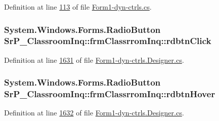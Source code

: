 \-Definition at line \hyperlink{_form1-dyn-ctrls_8cs_source_l00113}{113} of file \hyperlink{_form1-dyn-ctrls_8cs_source}{\-Form1-\/dyn-\/ctrls.\-cs}.

\hypertarget{class_sr_p___classroom_inq_1_1frm_classrrom_inq_a116a0f948fdc7187ae7dc028026eec59}{
\subsubsection[{rdbtn\-Click}]{\setlength{\rightskip}{0pt plus 5cm}\-System.\-Windows.\-Forms.\-Radio\-Button {\bf \-Sr\-P\-\_\-\-Classroom\-Inq\-::frm\-Classrrom\-Inq\-::rdbtn\-Click}}}
\label{class_sr_p___classroom_inq_1_1frm_classrrom_inq_a116a0f948fdc7187ae7dc028026eec59}


\-Definition at line \hyperlink{_form1-dyn-ctrls_8_designer_8cs_source_l01631}{1631} of file \hyperlink{_form1-dyn-ctrls_8_designer_8cs_source}{\-Form1-\/dyn-\/ctrls.\-Designer.\-cs}.

\hypertarget{class_sr_p___classroom_inq_1_1frm_classrrom_inq_a2bee4d450744662c189d99c17658dac7}{
\subsubsection[{rdbtn\-Hover}]{\setlength{\rightskip}{0pt plus 5cm}\-System.\-Windows.\-Forms.\-Radio\-Button {\bf \-Sr\-P\-\_\-\-Classroom\-Inq\-::frm\-Classrrom\-Inq\-::rdbtn\-Hover}}}
\label{class_sr_p___classroom_inq_1_1frm_classrrom_inq_a2bee4d450744662c189d99c17658dac7}


\-Definition at line \hyperlink{_form1-dyn-ctrls_8_designer_8cs_source_l01632}{1632} of file \hyperlink{_form1-dyn-ctrls_8_designer_8cs_source}{\-Form1-\/dyn-\/ctrls.\-Designer.\-cs}.

